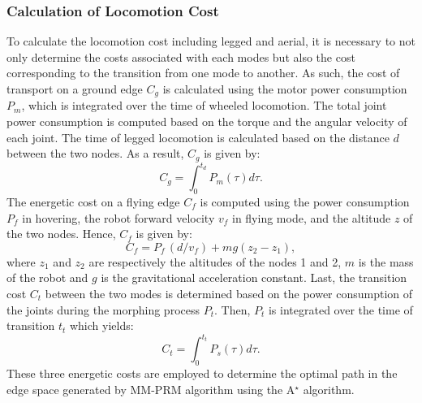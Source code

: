 \documentclass[letterpaper, 10 pt, conference]{ieeeconf}  %
\begin{document}
{%


\subsubsection{Calculation of Locomotion Cost}
\label{sec:cost_calculation}






To calculate the locomotion cost including legged and aerial, it is necessary to not only determine the costs associated with each modes but also the cost corresponding to the transition from one mode to another. As such, the cost of transport on a ground edge $C_g$ is calculated using the motor power consumption $P_m$, which is integrated over the time of wheeled locomotion. The total joint power consumption is computed based on the torque and the angular velocity of each joint. The time of legged locomotion is calculated based on the distance $d$ between the two nodes. As a result, $C_g$ is given by:
\begin{equation}
    \textstyle
    C_g =  \int_0^{t_d} P_m(\tau)d\tau.
\end{equation}
%
The energetic cost on a flying edge $C_f$ is computed using the power consumption $P_f$ in hovering, the robot forward velocity $v_f$ in flying mode, and the altitude $z$ of the two nodes. Hence, $C_f$ is given by:
\begin{equation}
    C_f = P_f \, (d / v_f) + mg(z_2 - z_1),
    \label{eq_Cf}
\end{equation}
%
\noindent where $z_1$ and $z_2$ are respectively the altitudes of the nodes 1 and 2, $m$ is the mass of the robot and $g$ is the gravitational acceleration constant. Last, the transition cost $C_t$ between the two modes is determined based on the power consumption of the joints during the morphing process $P_t$. Then, $P_t$ is integrated over the time of transition $t_t$ which yields:
%
\begin{equation}
\textstyle
    C_t = \int_0^{t_t} P_s(\tau)d\tau .
\end{equation}
%
\noindent These three energetic costs are employed to determine the optimal path in the edge space generated by MM-PRM algorithm using the A$^\star$ algorithm.

}
\end{document}
